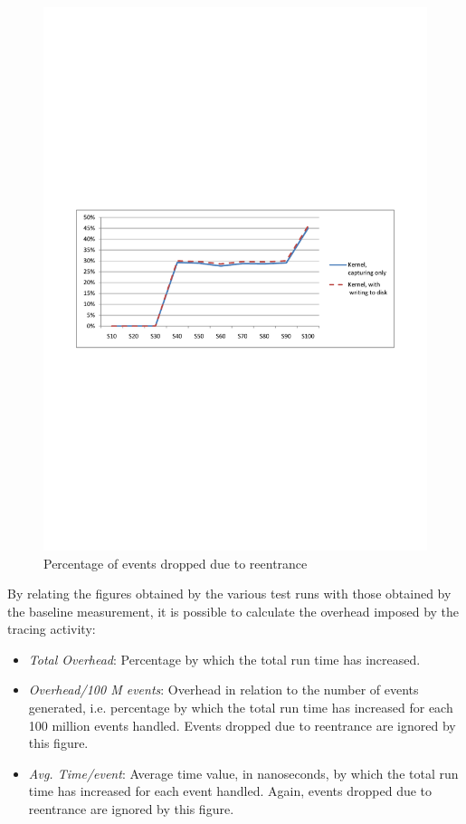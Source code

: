 \begin{figure}[h] 
\begin{centering} 
\includegraphics[scale=0.6, clip=true, viewport=1cm 10.5cm 20cm 19cm]{images/diagrams/Performance_Reent.pdf} 
\caption{Percentage of events dropped due to reentrance} 
\label{Performance_Reent} 
\end{centering} 
\end{figure}

By relating the figures obtained by the various test runs with those obtained by the baseline
measurement, it is possible to calculate the overhead imposed by the tracing activity:

\begin{itemize}
	\item \emph{Total Overhead}: Percentage by which the total run time has increased. 
	\item \emph{Overhead/100 M events}: Overhead in relation to the number of events generated, i.e.
				percentage by which the total run time has increased for each 100 million events handled.
				Events dropped due to reentrance are ignored by this figure.
	\item \emph{Avg. Time/event}: Average time value, in nanoseconds, by which the total run time has 
				increased for each event handled. Again, events dropped due to reentrance are ignored by this figure.
\end{itemize}

